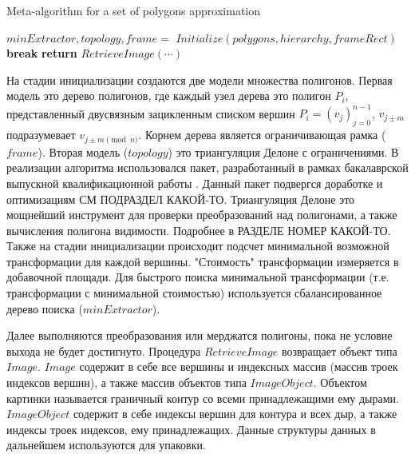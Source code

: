 \documentclass{fefu_thesis/cls/fefu}
\newenvironment{algo}[1][]
  {\begin{algorithm}[#1]
     \selectlanguage{english}
     \floatname{algorithm}{Алгоритм}
  }
  {\end{algorithm}}
\begin{document}
    \begin{algo}[H]
        \caption{Meta-algorithm for a set of polygons approximation}
        \begin{algorithmic}[1]
                \State $minExtractor, topology, frame = $
                \State $Initialize(polygons, hierarchy, frameRect)$
                    \State \textbf{break}
                    \EndIf
                \EndWhile
                \State \textbf{return} $RetrieveImage(\cdots)$
            \EndProcedure
        \end{algorithmic}
    \end{algo}

    На стадии инициализации создаются две модели множества полигонов. Первая модель это дерево полигонов, где каждый узел дерева это полигон $P_i$, представленный двусвязным зацикленным списком вершин $P_i = \left(v_j\right)_{j=0}^{n - 1}$, $v_{j \pm m}$ подразумевает $v_{j \pm m \pmod n}$. Корнем дерева является ограничивающая рамка ($frame$). Вторая модель ($topology$) это триангуляция Делоне с ограничениями. В реализации алгоритма использовался пакет, разработанный в рамках бакалаврской выпускной квалификационной работы \cite{Delaunay}. Данный пакет подвергся доработке и оптимизациям СМ ПОДРАЗДЕЛ КАКОЙ-ТО. Триангуляция Делоне это мощнейший инструмент для проверки преобразований над полигонами, а также вычисления полигона видимости. Подробнее в РАЗДЕЛЕ НОМЕР КАКОЙ-ТО. Также на стадии инициализации происходит подсчет минимальной возможной трансформации для каждой вершины. "Стоимость" трансформации измеряется в добавочной площади. Для быстрого поиска минимальной трансформации (т.е. трансформации с минимальной стоимостью) используется сбалансированное дерево поиска ($minExtractor$).

    Далее выполняются преобразования или мерджатся полигоны, пока не условие выхода не будет достигнуто. Процедура $RetrieveImage$ возвращает объект типа $Image$. $Image$ содержит в себе все вершины и индексных массив (массив троек индексов вершин), а также массив объектов типа $ImageObject$. Объектом картинки называется граничный контур со всеми принадлежащими ему дырами. $ImageObject$ содержит в себе индексы вершин для контура и всех дыр, а также индексы троек индексов, ему принадлежащих. Данные структуры данных в дальнейшем используются для упаковки.
\end{document}
